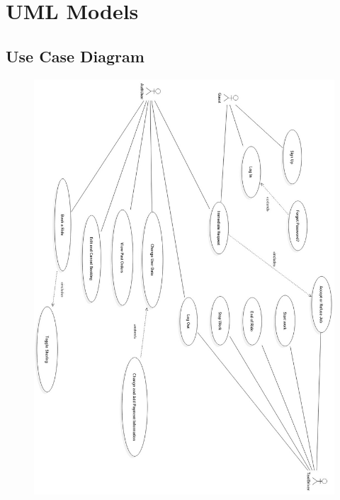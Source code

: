 \section{UML Models}

\subsection{Use Case Diagram}
	\begin{figure}[h!]
		\centering
		\includegraphics[height=0.85\textheight]{myTaxiServiceImg/UseCase/OverallUseCase.jpg}
	\end{figure}
\newpage

